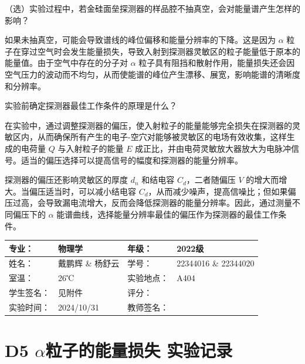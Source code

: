 \documentclass[dvipsnames, svgnames,a4paper,11pt]{article}
\begin{document}
\begin{question}
	（选）实验过程中，若金硅面垒探测器的样品腔不抽真空，会对能量谱产生怎样的影响？
\end{question}

	如果未抽真空，可能会导致谱线的峰位偏移和能量分辨率的下降。这是因为 $\alpha$ 粒子在穿过空气时会发生能量损失，导致入射到探测器灵敏区的粒子能量低于原本的能量值。由于空气中存在的分子对 $\alpha$ 粒子具有阻挡和散射作用，能量损失还会因空气压力的波动而不均匀，从而使能谱的峰位产生漂移、展宽，影响能谱的清晰度和分辨率。









\begin{question}
	实验前确定探测器最佳工作条件的原理是什么？
\end{question}

	在实验中，通过调整探测器的偏压，使入射粒子的能量能够完全损失在探测器的灵敏区内，从而确保所有产生的电子-空穴对能够被灵敏区的电场有效收集，这样生成的电荷量 $Q$ 与入射粒子的能量 $E$ 成正比，并由电荷灵敏放大器放大为电脉冲信号。适当的偏压选择可以提高信号的幅度和探测器的能量分辨率。

	探测器的偏压还影响灵敏区的厚度 $d_n$ 和结电容 $C_d$，二者随偏压 $V$ 的增大而增大。当偏压适当时，可以减小结电容 $C_d$，从而减少噪声，提高信噪比；但如果偏压过高，会导致漏电流增大，反而会降低探测器的能量分辨率。因此，通过测量不同偏压下的 $\alpha$ 能谱曲线，选择能量分辨率最佳的偏压作为探测器的最佳工作条件。




\clearpage
\begin{table}
	\renewcommand\arraystretch{1.7}
	\centering
	\begin{tabularx}{\textwidth}{|X|X|X|X|}
	\hline
	专业：& 物理学 &年级：& 2022级 \\
	\hline
	姓名：& 戴鹏辉 \& 杨舒云 & 学号：& 22344016 \& 22344020 \\
	\hline
	室温：& 26℃ & 实验地点： & A404 \\
	\hline
	学生签名：& 见附件 & 评分： &\\
	\hline
	实验时间：& 2024/10/31& 教师签名：&\\
	\hline
	\end{tabularx}
\end{table}

\section{D5 \quad $\alpha$粒子的能量损失 \quad\heiti 实验记录}
\end{document}
